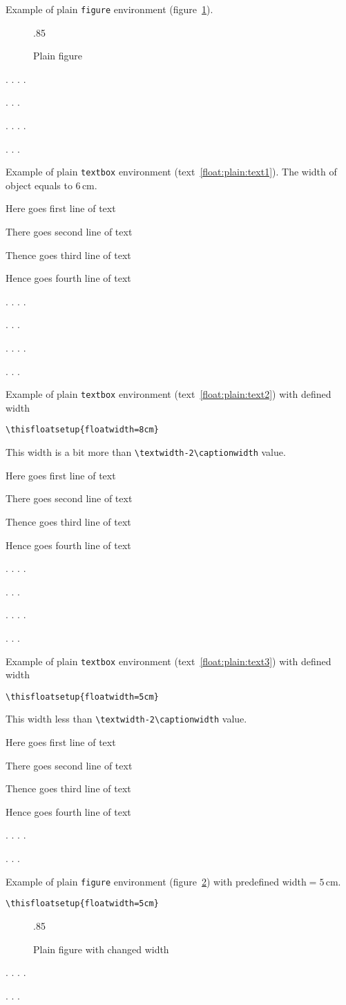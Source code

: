 \documentclass{book}
\providecommand*{\env}[1]{\texttt{#1}}
\def\TEXTBOX{Here goes first line of text \text

There goes second line of text

Thence goes third line of text \text

Hence goes fourth line of text}
\begin{document}
\def\Text{{\mdseries
\text. \text. \text.  \text. \par \text. \text. \text.}}

\ifx\pspicture\undefined\else{}\fi
\bfseries
\clearpage

Example of plain \env{figure} environment (figure~\ref{float:plain:fig}).
\begin{figure}
  {\unitlength.85\unitlength\ifx\pspicture\undefined\else{}\fi
  }%
  \caption{Plain figure}%
\label{float:plain:fig}%
\end{figure}%
\Text

\Text

Example of plain \env{textbox} environment (text~\ref{float:plain:text1}).
The width of object equals to 6\,cm.
\begin{textbox}
\TEXTBOX
\caption{Plain textbox without any settings}%
\label{float:plain:text1}%
\end{textbox}%
\Text

\Text

Example of plain \env{textbox} environment (text~\ref{float:plain:text2}) with defined width
\begin{verbatim}
\thisfloatsetup{floatwidth=8cm}
\end{verbatim}
This width is a bit more than \verb|\textwidth-2\captionwidth| value.

\begin{textbox}
\TEXTBOX
\caption{Plain textbox. Width settings}%
\label{float:plain:text2}%
\end{textbox}%
\Text

\Text

Example of plain \env{textbox} environment (text~\ref{float:plain:text3}) with defined width
\begin{verbatim}
\thisfloatsetup{floatwidth=5cm}
\end{verbatim}
This width less than \verb|\textwidth-2\captionwidth| value.

\begin{textbox}[!tb]
\TEXTBOX
\caption{Plain textbox. Width settings}%
\label{float:plain:text3}%
\end{textbox}%
\Text

Example of plain \env{figure} environment (figure~\ref{float:W:plain:fig2})
with predefined width${{}=5}$\,cm.
\begin{verbatim}
\thisfloatsetup{floatwidth=5cm}
\end{verbatim}
\begin{figure}
  {\unitlength.85\unitlength\ifx\pspicture\undefined\else{}\fi
  }%
  \caption{Plain figure with changed width}%
  \label{float:W:plain:fig2}%
\end{figure}%
\Text
\end{document}
